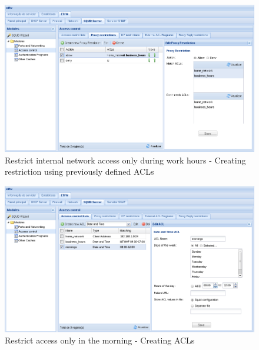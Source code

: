 \begin{figure}[H]
    \begin{center}
    \includegraphics[scale=0.38]{screenshots/etfw/etfw_squid_example_time_01_02.png}
    \caption{Restrict internal network access only during work hours - Creating restriction using previously defined ACLs}
    \label{fig:etfw_squid_example_time_01_02}
    \end{center}
\end{figure}

\begin{figure}[H]
    \begin{center}
    \includegraphics[scale=0.38]{screenshots/etfw/etfw_squid_example_time_02_01.png}
    \caption{Restrict access only in the morning - Creating ACLs}
    \label{fig:etfw_squid_example_time_02_01}
    \end{center}
\end{figure}

